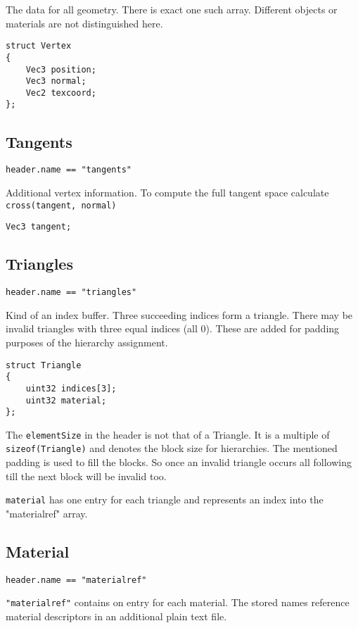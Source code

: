 \documentclass[english,10pt,a4paper,twocolumn,colorscheme=green]{orarticle}
\begin{document}
	The data for all geometry. There is exact one such array. Different objects
	or materials are not distinguished here.
	\begin{lstlisting}
struct Vertex
{
	Vec3 position;
	Vec3 normal;
	Vec2 texcoord;
};
	\end{lstlisting}
	
	\subsection{Tangents}
	\lstinline|header.name == "tangents"|
	
	Additional vertex information. To compute the full tangent space calculate \lstinline|cross(tangent, normal)|
	\begin{lstlisting}
Vec3 tangent;
	\end{lstlisting}
		
	\subsection{Triangles}
	\lstinline|header.name == "triangles"|
	
	Kind of an index buffer. Three succeeding indices form a triangle. There may be invalid triangles with three equal indices (all 0). These are added for padding purposes of the hierarchy assignment.
	\begin{lstlisting}
struct Triangle
{
	uint32 indices[3];
	uint32 material;
};
	\end{lstlisting}
	The \lstinline|elementSize| in the header is not that of a Triangle. It is a multiple of \lstinline|sizeof(Triangle)| and denotes the block size for hierarchies. The mentioned padding is used to fill the blocks. So once an invalid triangle occurs all following till the next block will be invalid too.
	
	\lstinline|material| has one entry for each triangle and represents an index into the "materialref" array.
	
	\subsection{Material}
	\lstinline|header.name == "materialref"|
	
	\lstinline|"materialref"| contains on entry for each material. The stored names reference material descriptors in an additional plain text file.
	
\end{document}
